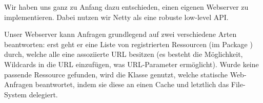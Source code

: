 Wir haben uns ganz zu Anfang dazu entschieden,
einen eigenen Webserver zu implementieren.
Dabei nutzen wir Netty als eine robuste low-level API.

Unser Webserver kann Anfragen grundlegend auf zwei verschiedene Arten beantworten:
erst geht er eine Liste von registrierten Ressourcen
(im Package )
durch,
welche alle eine assoziierte URL besitzen
(es besteht die Möglichkeit,
Wildcards in die URL einzufügen,
was URL-Parameter ermöglicht).
Wurde keine passende Ressource gefunden,
wird die Klasse  genutzt,
welche statische Web-Anfragen beantwortet,
indem sie diese an einen Cache und letztlich das File-System delegiert.
